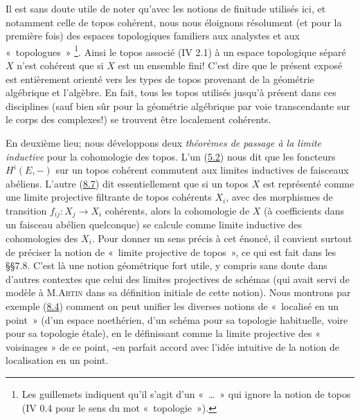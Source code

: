 \documentclass[10pt]{../fichiers-configuration-latex/smfart}
\begin{document}
Il est sans doute utile de noter qu'avec les notions de finitude
utilisés ici, et notamment celle de topos cohérent, nous nous
éloignons résolument (et pour la première fois) des espaces
topologiques familiers aux analystes et aux « topologues »
\footnote{Les guillemets indiquent qu'il s'agit d'un
  « \ldots » qui ignore la notion de topos (\cf IV 0.4 pour le
  sens du mot « topologie »).}. Ainsi le topos associé (IV 2.1) à un espace
topologique séparé $X$ n'est cohérent que si $X$ est un ensemble fini!
C'est dire que le présent exposé est entièrement orienté vers les
types de topos provenant de la géométrie algébrique et l'algèbre.
En fait, tous les topos utilisés jusqu'à présent dans ces disciplines (sauf bien sûr
pour la géométrie algébrique par voie transcendante sur le corps des
complexes!) se trouvent être localement cohérents.

En deuxième lieu; nous développons deux \emph{théorèmes de passage à
la limite inductive} pour la cohomologie des topos. L'un (\hyperref[VI.cor5.2]{5.2}) nous
dit que les foncteurs $H^{i}(E, -)$ \pageoriginale sur un topos
cohérent commutent aux limites inductives de faisceaux abéliens. L'autre (\hyperref[VI.subsec8.7]{8.7}) dit
essentiellement que si un topos $X$ est représenté comme une limite
projective filtrante de topos cohérents $X_i$, avec des morphismes
de transition $f_{ij} : X_j \to X_i$ cohérents, alors la cohomologie
de $X$ (à coefficients dans un faisceau abélien quelconque) se
calcule comme limite inductive des cohomologies des $X_i$. Pour
donner un sens précis à cet énoncé, il convient surtout de préciser
la notion de « limite projective de topos », ce qui est fait dans
les \S\S 7.8. C'est là une notion géométrique fort utile, y compris
sans doute dans d'autres contextes que celui des limites projectives
de schémas (qui avait servi de modèle à M.\textsc{Artin} dans sa définition
initiale de cette notion). Nous montrons par exemple (\hyperref[VI.subsec8.4]{8.4}) comment
on peut unifier les diverses notions de « localisé en un point »
(d'un espace noethérien, d'un schéma pour sa topologie habituelle,
voire pour sa topologie étale), en le définissant comme la limite
projective des « voisinages » de ce point, -en parfait accord
avec l'idée intuitive de la notion de localisation en un point.
\end{document}
